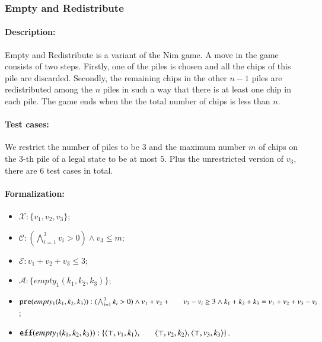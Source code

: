 \documentclass[review]{elsarticle}
\newcommand{\set}[1]{\{ #1 \}}
\newcommand{\tuple}[1]{\langle {#1} \rangle}
\newcommand{\true}{\top}
\newcommand{\statevar}{\mathcal{X}}
\newcommand{\act}{\mathcal{A}}
\newcommand{\constraint}{\mathcal{C}}
\newcommand{\estate}{\mathcal{E}}
\newcommand{\pre}{\mathtt{pre}}
\newcommand{\eff}{\mathtt{eff}}
\begin{document}
\subsubsection{Empty and Redistribute \protect\cite{Fer1998}}
\paragraph{Description:} 
Empty and Redistribute is a variant of the Nim game. 
A move in the game consists of two steps. 
Firstly, one of the piles is chosen and all the chips of this pile are discarded. 
Secondly, the remaining chips in the other $n-1$ piles are redistributed among the $n$ piles in such a way that there is at least one chip in each pile. 
The game ends when the the total number of chips is less than $n$.

\paragraph{Test cases:}
We restrict the number of piles to be $3$ and the maximum number $m$ of chips on the $3$-th pile  of a legal state to be at most $5$.
Plus the unrestricted version of $v_3$, there are $6$ test cases in total.
\paragraph{Formalization:}

\begin{itemize}
	\item $\statevar: \set{v_1, v_2, v_3}$;
	\item $\constraint: (\bigwedge_{i=1}^{3} v_i > 0)\wedge v_3 \le m$;
	\item $\estate: v_1+ v_2 +v_3 \le 3$;
	\item $\act: \set{empty_1(k_1, k_2, k_3)}$;
	\item $\pre(empty_1(k_1, k_2, k_3)) :  (\bigwedge_{i=1}^{3} k_i > 0) \wedge
	v_1+v_2+ \\ \hspace*{6mm}
	v_3 - v_i \ge  3    \wedge k_1 + k_2 +k_3 = v_1+v_2+v_3 - v_i$;
	\item $\eff(empty_1(k_1, k_2, k_3)) : \set{\tuple{\true, v_1, k_1},\\ \hspace*{6mm}
		\tuple{\true,v_2,k_2},\tuple{\true,v_3,k_3}}$.
\end{itemize}
\end{document}
